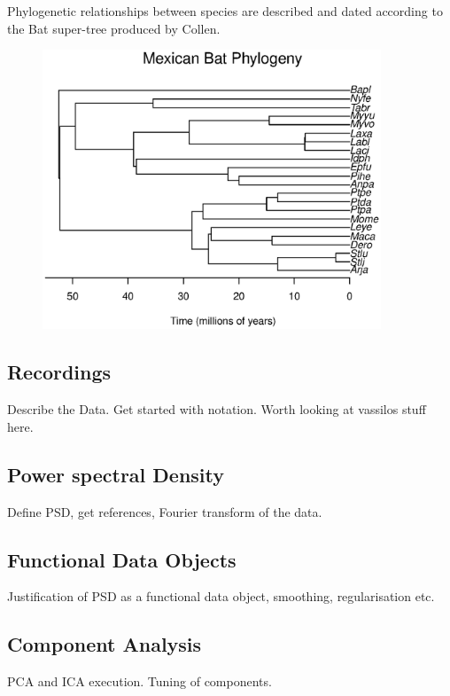 \documentclass[wsdraft]{ws-rv9x6} %
\begin{document}
Phylogenetic relationships between species are described and dated according to the Bat super-tree produced by Collen.\cite{collen2012evolution} 

\begin{figure}
	\centering
	\includegraphics[width= 0.9\textwidth]{../Figures/Phylogeny.eps}
\end{figure}
\subsection{Recordings}

Describe the Data. Get started with notation. Worth looking at vassilos stuff here.

\subsection{Power spectral Density}

Define PSD, get references, Fourier transform of the data.

\subsection{Functional Data Objects}

Justification of PSD as a functional data object, smoothing, regularisation etc.

\subsection{Component Analysis}

PCA and ICA execution. Tuning of components.
\end{document}
